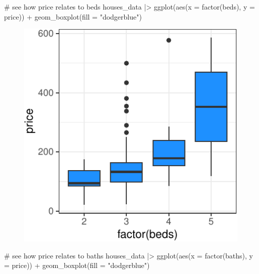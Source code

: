 \documentclass[
  11pt,
  letterpaper,
  oneside]{book}
\newenvironment{Shaded}{\begin{snugshade}}{\end{snugshade}}
\newcommand{\AttributeTok}[1]{\textcolor[rgb]{0.40,0.45,0.13}{#1}}
\newcommand{\CommentTok}[1]{\textcolor[rgb]{0.37,0.37,0.37}{#1}}
\newcommand{\FunctionTok}[1]{\textcolor[rgb]{0.28,0.35,0.67}{#1}}
\newcommand{\NormalTok}[1]{\textcolor[rgb]{0.00,0.23,0.31}{#1}}
\newcommand{\SpecialCharTok}[1]{\textcolor[rgb]{0.37,0.37,0.37}{#1}}
\newcommand{\StringTok}[1]{\textcolor[rgb]{0.13,0.47,0.30}{#1}}
\theoremstyle{plain}
\theoremstyle{plain}
\theoremstyle{definition}
\theoremstyle{definition}
\theoremstyle{plain}
\theoremstyle{remark}
\begin{document}
\begin{Shaded}
\begin{Highlighting}[]
\CommentTok{\# see how price relates to beds}
\NormalTok{houses\_data }\SpecialCharTok{|\textgreater{}}
  \FunctionTok{ggplot}\NormalTok{(}\FunctionTok{aes}\NormalTok{(}\AttributeTok{x =} \FunctionTok{factor}\NormalTok{(beds), }\AttributeTok{y =}\NormalTok{ price)) }\SpecialCharTok{+}
  \FunctionTok{geom\_boxplot}\NormalTok{(}\AttributeTok{fill =} \StringTok{"dodgerblue"}\NormalTok{)}
\end{Highlighting}
\end{Shaded}

\begin{figure}[H]

{\centering \includegraphics{r-demo-part-2_files/figure-pdf/unnamed-chunk-6-1.pdf}

}

\end{figure}

\begin{Shaded}
\begin{Highlighting}[]
\CommentTok{\# see how price relates to baths}
\NormalTok{houses\_data }\SpecialCharTok{|\textgreater{}}
  \FunctionTok{ggplot}\NormalTok{(}\FunctionTok{aes}\NormalTok{(}\AttributeTok{x =} \FunctionTok{factor}\NormalTok{(baths), }\AttributeTok{y =}\NormalTok{ price)) }\SpecialCharTok{+}
  \FunctionTok{geom\_boxplot}\NormalTok{(}\AttributeTok{fill =} \StringTok{"dodgerblue"}\NormalTok{)}
\end{Highlighting}
\end{Shaded}
\end{document}
